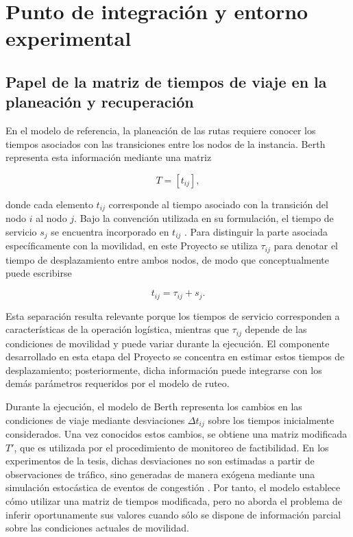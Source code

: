 \documentclass[11pt]{article}
\begin{document}
\section{Punto de integración y entorno experimental}
\subsection{Papel de la matriz de tiempos de viaje en la planeación y recuperación}

En el modelo de referencia, la planeación de las rutas requiere conocer los tiempos asociados con las transiciones entre los nodos de la instancia. Berth representa esta información mediante una matriz

\[
T=[t_{ij}],
\]

donde cada elemento $t_{ij}$ corresponde al tiempo asociado con la transición del nodo $i$ al nodo $j$. Bajo la convención utilizada en su formulación, el tiempo de servicio $s_j$ se encuentra incorporado en $t_{ij}$ \parencite{berth_thesis_2025}. Para distinguir la parte asociada específicamente con la movilidad, en este Proyecto se utiliza $\tau_{ij}$ para denotar el tiempo de desplazamiento entre ambos nodos, de modo que conceptualmente puede escribirse

\[
t_{ij}=\tau_{ij}+s_j.
\]

Esta separación resulta relevante porque los tiempos de servicio corresponden a características de la operación logística, mientras que $\tau_{ij}$ depende de las condiciones de movilidad y puede variar durante la ejecución. El componente desarrollado en esta etapa del Proyecto se concentra en estimar estos tiempos de desplazamiento; posteriormente, dicha información puede integrarse con los demás parámetros requeridos por el modelo de ruteo.

Durante la ejecución, el modelo de Berth representa los cambios en las condiciones de viaje mediante desviaciones $\Delta t_{ij}$ sobre los tiempos inicialmente considerados. Una vez conocidos estos cambios, se obtiene una matriz modificada $T'$, que es utilizada por el procedimiento de monitoreo de factibilidad. En los experimentos de la tesis, dichas desviaciones no son estimadas a partir de observaciones de tráfico, sino generadas de manera exógena mediante una simulación estocástica de eventos de congestión \parencite{berth_thesis_2025}. Por tanto, el modelo establece cómo utilizar una matriz de tiempos modificada, pero no aborda el problema de inferir oportunamente sus valores cuando sólo se dispone de información parcial sobre las condiciones actuales de movilidad.
\end{document}
